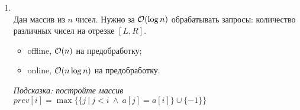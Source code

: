 \begin{enumerate}
  \item {}\\
    Дан массив из $n$ чисел. Нужно за $\mathcal{O}(\log n)$ обрабатывать запросы: количество
    различных чисел на отрезке $[L, R]$.
        \begin{itemize}
            \item offline, $\mathcal{O}(n)$ на предобработку;
            \item online, $\mathcal{O}(n \log n)$ на предобработку.
        \end{itemize}
    \emph{Подсказка: постройте массив $prev[i] = \max \Big\lbrace \{ j ~|~ j < i ~\land~ a[j] = a[i] \} \cup \{-1\} \Big\rbrace$}




\end{enumerate}
